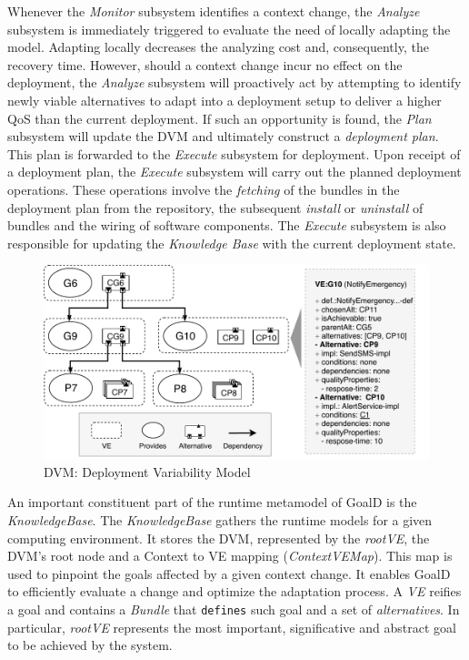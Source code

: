 \documentclass[conference]{IEEEtran}
\begin{document}
Whenever the \emph{Monitor} subsystem identifies a context change, the \emph{Analyze} subsystem is immediately triggered to evaluate the need of locally adapting the model. Adapting locally decreases the analyzing cost and, consequently, the recovery time. However, should a context change incur no effect on the deployment, the \emph{Analyze} subsystem will proactively act by attempting to identify newly viable alternatives to adapt into a deployment setup to deliver a higher QoS than the current deployment. If such an opportunity is found, the \emph{Plan} subsystem will update the DVM and ultimately construct a \emph{deployment plan}. This plan is forwarded to the \emph{Execute} subsystem for deployment.
Upon receipt of a deployment plan, the \emph{Execute} subsystem will carry out the planned deployment operations. These operations involve the \emph{fetching} of the bundles in the deployment plan from the repository, the subsequent \emph{install} or \emph{uninstall} of bundles and the wiring of software components. The \emph{Execute} subsystem is also responsible for updating the \emph{Knowledge Base} with the current deployment state.


\begin{figure}[!htb]
  \centering
  \includegraphics[width=1.0\linewidth]{images/dvm_deployment_variability_model}
  \caption{DVM: Deployment Variability Model}
\label{fig:dvm}
\end{figure}




An important constituent part of the runtime metamodel of GoalD is the \emph{KnowledgeBase}. The \emph{KnowledgeBase} gathers the runtime models for a given computing environment. It stores the DVM, represented by the \emph{rootVE}, the DVM's root node and a Context to VE mapping (\emph{ContextVEMap}). This map is used to pinpoint the goals affected by a given context change. It enables GoalD to efficiently evaluate a change and optimize the adaptation process. A \emph{VE} reifies a goal and contains a \emph{Bundle} that \verb|defines| such goal and a set of \emph{alternatives}. In particular, \emph{rootVE} represents the most important, significative and abstract goal to be achieved by the system.
\end{document}
